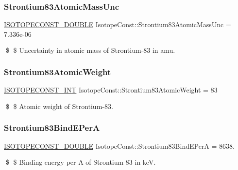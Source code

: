 \subsubsection{\texorpdfstring{Strontium83\+Atomic\+Mass\+Unc}{Strontium83AtomicMassUnc}}
{\footnotesize\ttfamily \mbox{\hyperlink{group___isotope_const-_macros_ga8f45a7272ce02c0b4c65c44636ed719a}{I\+S\+O\+T\+O\+P\+E\+C\+O\+N\+S\+T\+\_\+\+D\+O\+U\+B\+LE}} Isotope\+Const\+::\+Strontium83\+Atomic\+Mass\+Unc = 7.\+336e-\/06}

\$ \$ Uncertainty in atomic mass of Strontium-\/83 in amu. \mbox{\label{group___isotope_const-_strontium-_sr83_gaa8d11ea369b1c93e254ab6cccb2607a0}} 
\subsubsection{\texorpdfstring{Strontium83\+Atomic\+Weight}{Strontium83AtomicWeight}}
{\footnotesize\ttfamily \mbox{\hyperlink{group___isotope_const-_macros_ga5f18360b3e99483a35c32d789e62621c}{I\+S\+O\+T\+O\+P\+E\+C\+O\+N\+S\+T\+\_\+\+I\+NT}} Isotope\+Const\+::\+Strontium83\+Atomic\+Weight = 83}

\$ \$ Atomic weight of Strontium-\/83. \mbox{\label{group___isotope_const-_strontium-_sr83_gab6e516c808dabde5b5161fc5f04bdfa9}} 
\subsubsection{\texorpdfstring{Strontium83\+Bind\+E\+PerA}{Strontium83BindEPerA}}
{\footnotesize\ttfamily \mbox{\hyperlink{group___isotope_const-_macros_ga8f45a7272ce02c0b4c65c44636ed719a}{I\+S\+O\+T\+O\+P\+E\+C\+O\+N\+S\+T\+\_\+\+D\+O\+U\+B\+LE}} Isotope\+Const\+::\+Strontium83\+Bind\+E\+PerA = 8638.}

\$ \$ Binding energy per A of Strontium-\/83 in keV. \mbox{\label{group___isotope_const-_strontium-_sr83_ga473e3acaae2b2b2e2fbfcae54e8dff29}} 
